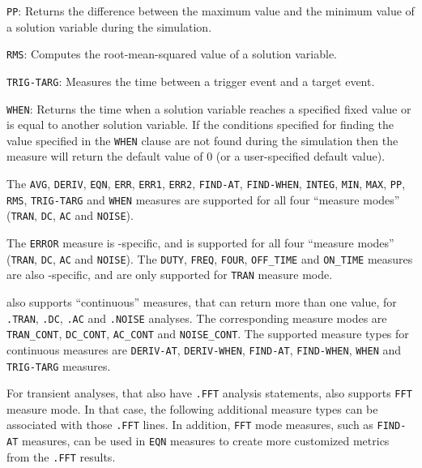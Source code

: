 {{\begin{XyceItemize}
  \item \texttt{PP}: Returns the difference between the maximum value and the minimum value of
    a solution variable during the simulation.
  \item \texttt{RMS}: Computes the root-mean-squared value of a solution variable.
  \item \texttt{TRIG-TARG}: Measures the time between a trigger event and a target event.
  \item \texttt{WHEN}: Returns the time when a solution variable reaches a specified fixed 
    value or is equal to another solution variable.  If the conditions specified for
    finding the value specified in the \texttt{WHEN} clause are not found during the simulation 
    then the measure will return the default value of 0 (or a user-specified default value).
\end{XyceItemize}

The \texttt{AVG}, \texttt{DERIV}, \texttt{EQN},   \texttt{ERR},  \texttt{ERR1}, \texttt{ERR2},
\texttt{FIND-AT}, \texttt{FIND-WHEN}, \texttt{INTEG}, \texttt{MIN}, \texttt{MAX}, \texttt{PP},
\texttt{RMS}, \texttt{TRIG-TARG} and \texttt{WHEN} measures are supported for all four ``measure
modes'' (\texttt{TRAN}, \texttt{DC}, \texttt{AC} and \texttt{NOISE}).

The \texttt{ERROR} measure is \Xyce{}-specific, and is supported for all four ``measure modes''
(\texttt{TRAN}, \texttt{DC}, \texttt{AC} and \texttt{NOISE}). The \texttt{DUTY}, \texttt{FREQ},
\texttt{FOUR}, \texttt{OFF\_TIME} and \texttt{ON\_TIME} measures are also \Xyce{}-specific,
and are only supported for \texttt{TRAN} measure mode.

\Xyce{} also supports ``continuous'' measures, that can return more than one value, for
\texttt{.TRAN}, \texttt{.DC}, \texttt{.AC} and \texttt{.NOISE} analyses.  The
 corresponding measure modes are \texttt{TRAN\_CONT}, \texttt{DC\_CONT},
\texttt{AC\_CONT} and \texttt{NOISE\_CONT}.  The supported measure types for continuous
measures are \texttt{DERIV-AT}, \texttt{DERIV-WHEN}, \texttt{FIND-AT}, \texttt{FIND-WHEN}, 
\texttt{WHEN} and \texttt{TRIG-TARG} measures.

For transient analyses, that also have \texttt{.FFT} analysis statements, \Xyce{} also
supports \texttt{FFT} measure mode.  In that case, the following additional measure
types can be associated with those \texttt{.FFT} lines.  In addition, \texttt{FFT}
mode measures, such as \texttt{FIND-AT} measures, can be used in \texttt{EQN} measures
to create more customized metrics from the \texttt{.FFT} results.

}}
